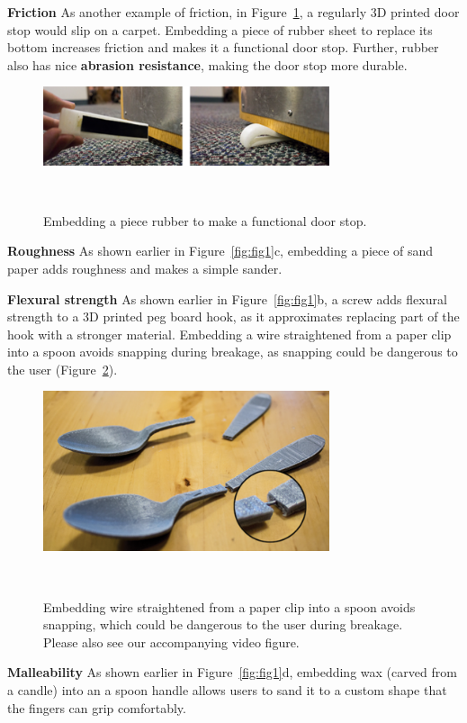 \textbf{Friction} As another example of friction, in Figure~\ref{fig:door_stop}, a regularly 3D printed door stop would slip on a carpet. Embedding a piece of rubber sheet to replace its bottom increases friction and makes it a functional door stop. Further, rubber also has nice \textbf{abrasion resistance}, making the door stop more durable.

\begin{figure} [h!]
  \centering
  \includegraphics[width=0.75\textwidth]{figures/door_stop}
  \caption{Embedding a piece rubber to make a functional door stop.}~\label{fig:door_stop}
\end{figure}

\textbf{Roughness} As shown earlier in Figure~\ref{fig:fig1}c, embedding a piece of sand paper adds roughness and makes a simple sander.

\textbf{Flexural strength} As shown earlier in Figure~\ref{fig:fig1}b, a screw adds flexural strength to a 3D printed peg board hook, as it approximates replacing part of the hook with a stronger material. Embedding a wire straightened from a paper clip into a spoon avoids snapping during breakage, as snapping could be dangerous to the user (Figure~\ref{fig:spoon}).

\begin{figure} [h!]
  \centering
  \includegraphics[width=0.75\textwidth]{figures/spoon}
  \caption{Embedding wire straightened from a paper clip into a spoon avoids snapping, which could be dangerous to the user during breakage. Please also see our accompanying video figure.}~\label{fig:spoon}
\end{figure}

\textbf{Malleability} As shown earlier in Figure~\ref{fig:fig1}d, embedding wax (carved from a candle) into an a spoon handle allows users to sand it to a custom shape that the fingers can grip comfortably. 

